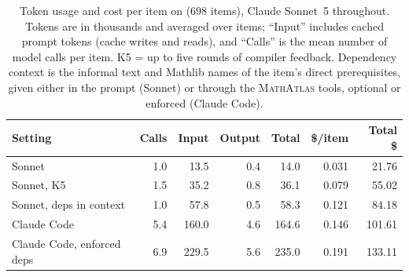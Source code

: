 \begin{table}[t]
  \centering
  \caption{Token usage and cost per item on \hardname{} (698 items), Claude Sonnet~5 throughout.
  Tokens are in thousands and averaged over items; ``Input'' includes cached prompt tokens
  (cache writes and reads), and ``Calls'' is the mean number of model calls per item.
  K5 = up to five rounds of compiler feedback. Dependency context is the informal text and Mathlib
  names of the item's direct prerequisites, given either in the prompt (Sonnet) or through the
  \textsc{MathAtlas} tools, optional or enforced (Claude Code).}
  \label{tab:iclr-tokens}
  \vspace{0.5em}
  \small
  \begin{tabular}{@{}lrrrrrr@{}}
    \toprule
    Setting & Calls & Input & Output & Total & \$/item & Total \$ \\
    \midrule
    Sonnet                      & 1.0 & 13.5  & 0.4 & 14.0  & 0.031 & 21.76  \\
    Sonnet, K5                  & 1.5 & 35.2  & 0.8 & 36.1  & 0.079 & 55.02  \\
    Sonnet, deps in context     & 1.0 & 57.8  & 0.5 & 58.3  & 0.121 & 84.18  \\
    Claude Code                 & 5.4 & 160.0 & 4.6 & 164.6 & 0.146 & 101.61 \\
    Claude Code, enforced deps  & 6.9 & 229.5 & 5.6 & 235.0 & 0.191 & 133.11 \\
    \bottomrule
  \end{tabular}
\end{table}
